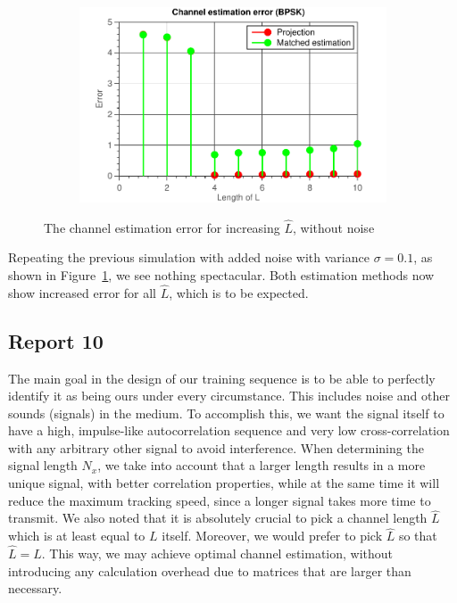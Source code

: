 \documentclass[11pt,titlepage]{report}
\begin{document}
\begin{figure}[H]
\begin{subfigure}{0.49\textwidth}
	\end{subfigure}
	\begin{subfigure}{0.49\textwidth}
		\includegraphics[width=\textwidth]{resource/ass-1-report-9-BPSK-noise.pdf}
	\end{subfigure}
	\caption{The channel estimation error for increasing $\hat{L}$, without noise}
	\label{fig:rep9-error-noise}
\end{figure}

Repeating the previous simulation with added noise with variance $\sigma = 0.1$, as shown in Figure~\ref{fig:rep9-error-noise}, we see nothing spectacular. Both estimation methods now show increased error for all $\hat{L}$, which is to be expected. 

\subsection{Report 10}
The main goal in the design of our training sequence is to be able to perfectly identify it as being ours under every circumstance. This includes noise and other sounds (signals) in the medium. To accomplish this, we want the signal itself to have a high, impulse-like autocorrelation sequence and very low cross-correlation with any arbitrary other signal to avoid interference.
When determining the signal length $N_x$, we take into account that a larger length results in a more unique signal, with better correlation properties, while at the same time it will reduce the maximum tracking speed, since a longer signal takes more time to transmit.
We also noted that it is absolutely crucial to pick a channel length $\hat{L}$ which is at least equal to $L$ itself. Moreover, we would prefer to pick $\hat{L}$ so that $\hat{L} = L$. This way, we may achieve optimal channel estimation, without introducing any calculation overhead due to matrices that are larger than necessary.
\end{document}
